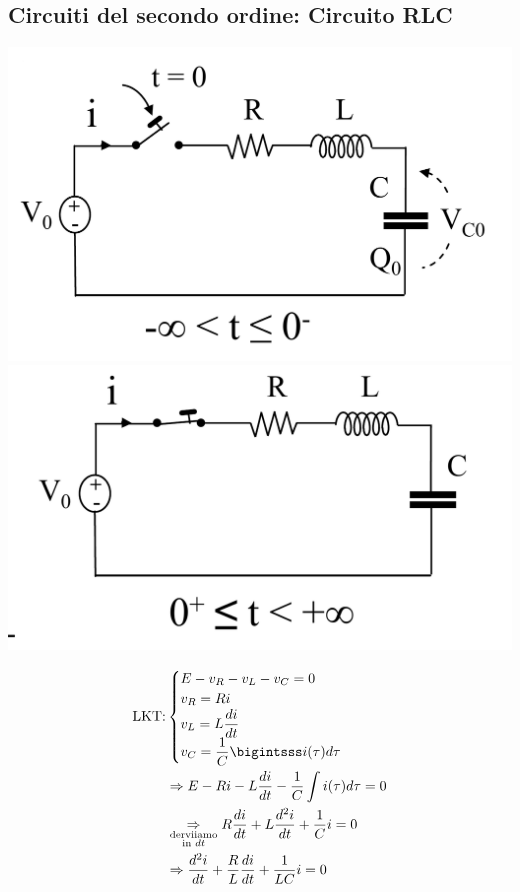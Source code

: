 \documentclass{article}
\begin{document}
\subsection{Circuiti del secondo ordine: Circuito RLC}
\begin{center}
    \includegraphics[scale=0.25]{Image/RLC_1.png}
    \includegraphics[scale=0.25]{Image/RLC_0.png}
\end{center}
\begin{align*}
    \T{LKT:}
    &\begin{cases}
        E-v_R-v_L-v_C=0\\
        v_R = R i \\
        v_L = L \dfrac{di}{dt}\\
        v_C = \dfrac{1}{C} \bigintsss i(\tau) d \tau
    \end{cases}\\
    &\Rightarrow E - R i - L \frac{di}{dt} - \frac{1}{C} \int i(\tau) d \tau = 0\\
    &\underset{\substack{\T{derviiamo}\\ \T{in }dt}}{\Rightarrow} R \frac{di}{dt} + L \frac{d^2i}{dt} + \frac{1}{C}i = 0\\
    &\Rightarrow \frac{d^2i}{dt} + \frac{R}{L} \frac{di}{dt} + \frac{1}{LC}i = 0
\end{align*}
\end{document}
